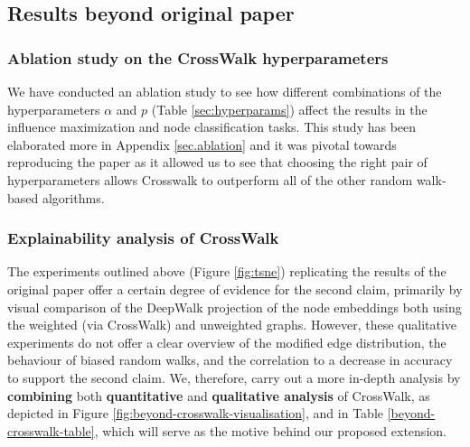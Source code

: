 
\subsection{Results beyond original paper}


\subsubsection{Ablation study on the CrossWalk hyperparameters}

We have conducted an ablation study to see how different combinations of the hyperparameters $\alpha$ and $p$ (Table \ref{sec:hyperparams}) affect the results in the influence maximization and node classification tasks. This study has been elaborated more in Appendix \ref{sec.ablation} and it was pivotal towards reproducing the paper as it allowed us to see that choosing the right pair of hyperparameters allows Crosswalk to outperform all of the other random walk-based algorithms.


\subsubsection{Explainability analysis of CrossWalk}
\label{sec:vis}
The experiments outlined above (Figure \ref{fig:tsne}) replicating the results of the original paper offer a certain degree of evidence for the second claim, primarily by visual comparison of the DeepWalk projection of the node embeddings both using the weighted (via CrossWalk) and unweighted graphs. However, these qualitative experiments do not offer a clear overview of the modified edge distribution, the behaviour of biased random walks, and the correlation to a decrease in accuracy to support the second claim. We, therefore, carry out a more in-depth analysis by \textbf{combining} both \textbf{quantitative} and \textbf{qualitative analysis} of CrossWalk, as depicted in Figure \ref{fig:beyond-crosswalk-visualisation}, and in Table \ref{beyond-crosswalk-table}, which will serve as the motive behind our proposed extension. \\

